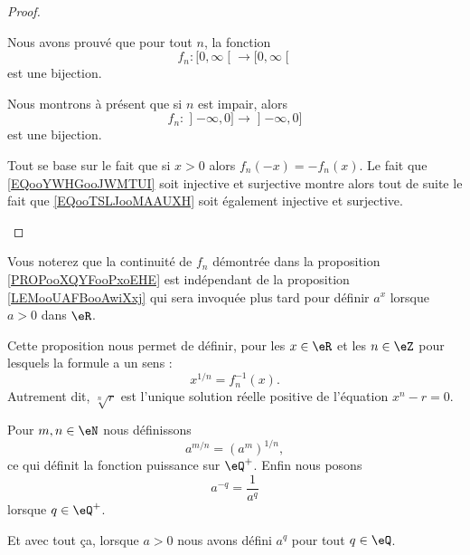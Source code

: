 \begin{proof}
\begin{subproof}
            Nous avons prouvé que pour tout \( n\), la fonction
            \begin{equation}        \label{EQooYWHGooJWMTUI}
                f_n\colon \mathopen[ 0 , \infty \mathclose[\to \mathopen[ 0 , \infty \mathclose[
            \end{equation}
            est une bijection.

        \item[Pour \( n\) impair]

            Nous montrons à présent que si \( n\) est impair, alors
            \begin{equation}        \label{EQooTSLJooMAAUXH}
                f_n\colon \mathopen] -\infty , 0 \mathclose]\to \mathopen] -\infty , 0 \mathclose]
            \end{equation}
            est une bijection.

            Tout se base sur le fait que si \( x>0\) alors \( f_n(-x)=-f_n(x)\). Le fait que \eqref{EQooYWHGooJWMTUI} soit injective et surjective montre alors tout de suite le fait que \eqref{EQooTSLJooMAAUXH} soit également injective et surjective.
    \end{subproof}
\end{proof}

Vous noterez que la continuité de \( f_n\) démontrée dans la proposition \ref{PROPooXQYFooPxoEHE} est indépendant de la proposition \ref{LEMooUAFBooAwiXxj} qui sera invoquée plus tard pour définir \( a^x\) lorsque \( a>0\) dans \( \eR\).

\begin{definition}        \label{DEFooJWQLooWkOBxQ}
    Cette proposition nous permet de définir, pour les \( x\in \eR\) et les \( n\in \eZ\) pour lesquels la formule a un sens :
    \begin{equation}
        x^{1/n}=f_n^{-1}(x).
    \end{equation}
    Autrement dit, \( \sqrt[n]{ r }\) est l'unique solution réelle positive de l'équation \( x^n-r=0\).

    Pour \( m,n\in \eN\) nous définissons 
    \begin{equation}
        a^{m/n}=(a^m)^{1/n},
    \end{equation}
    ce qui définit la fonction puissance sur \( \eQ^+\). Enfin nous posons
    \begin{equation}
        a^{-q}=\frac{1}{ a^q }
    \end{equation}
    lorsque \( q\in \eQ^+\).

    Et avec tout ça, lorsque \( a>0\) nous avons défini \( a^q\) pour tout \( q\in \eQ\).
\end{definition}

